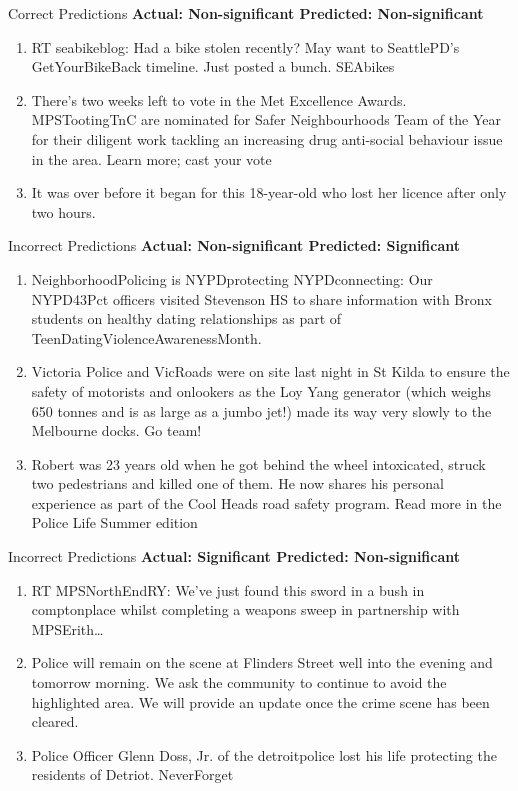 \documentclass[12pt]{beamer}
\begin{document}
\begin{frame}{Correct Predictions}
    \textbf{Actual: Non-significant \hfill Predicted: Non-significant}
    \begin{enumerate}
        \item RT seabikeblog: Had a bike stolen recently? May want to SeattlePD’s GetYourBikeBack timeline. Just posted a bunch. SEAbikes
        \item There's two weeks left to vote in the Met Excellence Awards. MPSTootingTnC are nominated for Safer Neighbourhoods Team of the Year for their diligent work tackling an increasing drug anti-social behaviour issue in the area. Learn more; cast your vote
        \item It was over before it began for this 18-year-old who lost her licence after only two hours.
    \end{enumerate}
\end{frame}

\begin{frame}{Incorrect Predictions}
    \textbf{Actual: Non-significant \hfill Predicted: Significant}
    \begin{enumerate}
        \item NeighborhoodPolicing is NYPDprotecting NYPDconnecting: Our NYPD43Pct officers visited Stevenson HS to share information with Bronx students on healthy dating relationships as part of TeenDatingViolenceAwarenessMonth.
        \item Victoria Police and VicRoads were on site last night in St Kilda to ensure the safety of motorists and onlookers as the Loy Yang generator (which weighs 650 tonnes and is as large as a jumbo jet!) made its way very slowly to the Melbourne docks. Go team!
        \item Robert was 23 years old when he got behind the wheel intoxicated, struck two pedestrians and killed one of them. He now shares his personal experience as part of the Cool Heads road safety program. Read more in the Police Life Summer edition
    \end{enumerate}
\end{frame}

\begin{frame}{Incorrect Predictions}
    \textbf{Actual: Significant \hfill Predicted: Non-significant}
    \begin{enumerate}
        \item RT MPSNorthEndRY: We've just found this sword in a bush in comptonplace whilst completing a weapons sweep in partnership with MPSErith…
        \item Police will remain on the scene at Flinders Street well into the evening and tomorrow morning. We ask the community to continue to avoid the highlighted area. We will provide an update once the crime scene has been cleared.
        \item Police Officer Glenn Doss, Jr. of the detroitpolice lost his life protecting the residents of Detriot. NeverForget
    \end{enumerate}
\end{frame}
\end{document}
